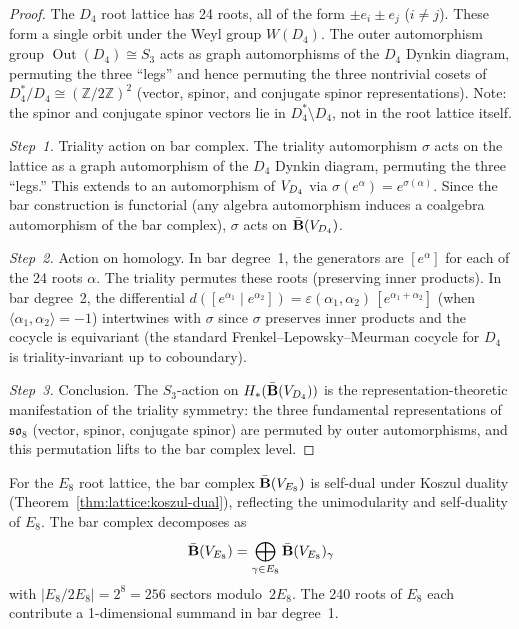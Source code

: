 \begin{proof}
The $D_4$ root lattice has 24 roots, all of the form $\pm e_i \pm e_j$ ($i \neq j$).  These form a single orbit under the Weyl group $W(D_4)$.  The outer automorphism group $\operatorname{Out}(D_4) \cong S_3$ acts as graph automorphisms of the $D_4$ Dynkin diagram, permuting the three ``legs'' and hence permuting the three nontrivial cosets of $D_4^*/D_4 \cong (\mathbb{Z}/2\mathbb{Z})^2$ (vector, spinor, and conjugate spinor representations).  Note: the spinor and conjugate spinor vectors lie in $D_4^* \setminus D_4$, not in the root lattice itself.

\emph{Step~1.} Triality action on bar complex.
The triality automorphism $\sigma$ acts on the lattice as a graph automorphism of the $D_4$ Dynkin diagram, permuting the three ``legs.''  This extends to an automorphism of $V_{D_4}$ via $\sigma(e^\alpha) = e^{\sigma(\alpha)}$.  Since the bar construction is functorial (any algebra automorphism induces a coalgebra automorphism of the bar complex), $\sigma$ acts on $\bar{\mathbf{B}}(V_{D_4})$.

\emph{Step~2.} Action on homology.
In bar degree~1, the generators are $[e^\alpha]$ for each of the 24 roots $\alpha$.  The triality permutes these roots (preserving inner products).  In bar degree~2, the differential $d([e^{\alpha_1} \mid e^{\alpha_2}]) = \varepsilon(\alpha_1,\alpha_2)\,[e^{\alpha_1+\alpha_2}]$ (when $\langle\alpha_1,\alpha_2\rangle = -1$) intertwines with $\sigma$ since $\sigma$ preserves inner products and the cocycle is equivariant (the standard Frenkel--Lepowsky--Meurman cocycle for $D_4$ is triality-invariant up to coboundary).

\emph{Step~3.} Conclusion.
The $S_3$-action on $H_*(\bar{\mathbf{B}}(V_{D_4}))$ is the representation-theoretic manifestation of the triality symmetry: the three fundamental representations of $\mathfrak{so}_8$ (vector, spinor, conjugate spinor) are permuted by outer automorphisms, and this permutation lifts to the bar complex level.
\end{proof}

\begin{proposition}
\label{prop:lattice:bar-E8}
For the $E_8$ root lattice, the bar complex $\bar{\mathbf{B}}(V_{E_8})$ is
self-dual under Koszul duality (Theorem~\ref{thm:lattice:koszul-dual}),
reflecting the unimodularity and self-duality of $E_8$.
The bar complex decomposes as
\[
\bar{\mathbf{B}}(V_{E_8})
= \bigoplus_{\gamma \in E_8} \bar{\mathbf{B}}(V_{E_8})_\gamma
\]
with $|E_8/2E_8| = 2^8 = 256$ sectors modulo~$2E_8$. The 240 roots of
$E_8$ each contribute a 1-dimensional summand in bar degree~1.
\end{proposition}

